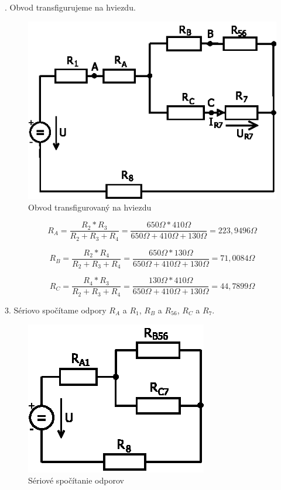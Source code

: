 \documentclass[a4paper,12pt]{article}
\begin{document}
. Obvod transfigurujeme na hviezdu.
\begin{figure}[!htb]
\centering
\includegraphics[scale=1.5]{p1/p3.eps}
\caption{Obvod transfigurovaný na hviezdu}
\end{figure}

\begin{equation}
R_A = \frac{R_2 * R_3}{ R_2 + R_3 + R_4} = \frac{650\Omega*410\Omega}{650\Omega+410\Omega+130\Omega} = 223,9496\Omega
\end{equation}

\begin{equation}
R_B = \frac{R_2 * R_4}{ R_2 + R_3 + R_4} = \frac{650\Omega*130\Omega}{650\Omega+410\Omega+130\Omega} = 71,0084\Omega
\end{equation}

\begin{equation}
R_C = \frac{R_4 * R_3}{ R_2 + R_3 + R_4} = \frac{130\Omega*410\Omega}{650\Omega+410\Omega+130\Omega} = 44,7899\Omega
\end{equation}
 \bigskip

3. Sériovo spočítame odpory $R_A$ a $R_1$, $R_B$ a  $R_{56}$, $R_C$ a  $R_7$.
\begin{figure}[!htb]
\centering
\includegraphics[scale=1.5]{p1/p4.eps}
\caption{Sériové spočítanie odporov}
\end{figure}
\end{document}
